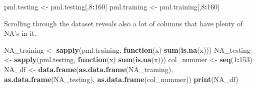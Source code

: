 \documentclass[]{article}
\newenvironment{Shaded}{\begin{snugshade}}{\end{snugshade}}
\newcommand{\KeywordTok}[1]{\textcolor[rgb]{0.13,0.29,0.53}{\textbf{#1}}}
\newcommand{\DecValTok}[1]{\textcolor[rgb]{0.00,0.00,0.81}{#1}}
\newcommand{\StringTok}[1]{\textcolor[rgb]{0.31,0.60,0.02}{#1}}
\newcommand{\ControlFlowTok}[1]{\textcolor[rgb]{0.13,0.29,0.53}{\textbf{#1}}}
\newcommand{\OperatorTok}[1]{\textcolor[rgb]{0.81,0.36,0.00}{\textbf{#1}}}
\newcommand{\NormalTok}[1]{#1}
\begin{document}
\begin{Shaded}
\begin{Highlighting}[]
\NormalTok{pml.testing <-}\StringTok{ }\NormalTok{pml.testing[,}\DecValTok{8}\OperatorTok{:}\DecValTok{160}\NormalTok{]}
\NormalTok{pml.training <-}\StringTok{ }\NormalTok{pml.training[,}\DecValTok{8}\OperatorTok{:}\DecValTok{160}\NormalTok{]}
\end{Highlighting}
\end{Shaded}

Scrolling through the dataset reveals also a lot of columns that have
plenty of NA's in it.

\begin{Shaded}
\begin{Highlighting}[]
\NormalTok{NA_training <-}\StringTok{ }\KeywordTok{sapply}\NormalTok{(pml.training, }\ControlFlowTok{function}\NormalTok{(x) }\KeywordTok{sum}\NormalTok{(}\KeywordTok{is.na}\NormalTok{(x)))}
\NormalTok{NA_testing <-}\StringTok{ }\KeywordTok{sapply}\NormalTok{(pml.testing, }\ControlFlowTok{function}\NormalTok{(x) }\KeywordTok{sum}\NormalTok{(}\KeywordTok{is.na}\NormalTok{(x)))}
\NormalTok{col_nummer <-}\StringTok{ }\KeywordTok{seq}\NormalTok{(}\DecValTok{1}\OperatorTok{:}\DecValTok{153}\NormalTok{)}
\NormalTok{NA_df <-}\StringTok{ }\KeywordTok{data.frame}\NormalTok{(}\KeywordTok{as.data.frame}\NormalTok{(NA_training), }\KeywordTok{as.data.frame}\NormalTok{(NA_testing), }\KeywordTok{as.data.frame}\NormalTok{(col_nummer))}
\KeywordTok{print}\NormalTok{(NA_df)}
\end{Highlighting}
\end{Shaded}
\end{document}
